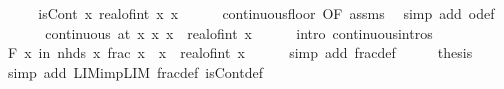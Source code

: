 \begin{isabellebody}
%
\isadelimproof
%
\endisadelimproof
%
\isatagproof
{}\isamarkupfalse%
\ {\isacharminus}{\kern0pt}\isanewline
\ \ \isamarkupfalse%
\ {\isachardoublequoteopen}isCont\ {\isacharparenleft}{\kern0pt}{\isasymlambda}x{\isachardot}{\kern0pt}\ real{\isacharunderscore}{\kern0pt}of{\isacharunderscore}{\kern0pt}int\ {\isasymlfloor}x{\isasymrfloor}{\isacharparenright}{\kern0pt}\ x{\isachardoublequoteclose}\isanewline
\ \ \ \ \isamarkupfalse%
\ continuous{\isacharunderscore}{\kern0pt}floor\ {\isacharbrackleft}{\kern0pt}OF\ assms{\isacharbrackright}{\kern0pt}\ \isamarkupfalse%
\ {\isacharparenleft}{\kern0pt}simp\ add{\isacharcolon}{\kern0pt}\ o{\isacharunderscore}{\kern0pt}def{\isacharparenright}{\kern0pt}\isanewline
\ \ \isamarkupfalse%
\ \isamarkupfalse%
\ {\isacharasterisk}{\kern0pt}{\isacharcolon}{\kern0pt}\ {\isachardoublequoteopen}continuous\ {\isacharparenleft}{\kern0pt}at\ x{\isacharparenright}{\kern0pt}\ {\isacharparenleft}{\kern0pt}{\isasymlambda}x{\isachardot}{\kern0pt}\ x\ {\isacharminus}{\kern0pt}\ real{\isacharunderscore}{\kern0pt}of{\isacharunderscore}{\kern0pt}int\ {\isasymlfloor}x{\isasymrfloor}{\isacharparenright}{\kern0pt}{\isachardoublequoteclose}\isanewline
\ \ \ \ \isamarkupfalse%
\ {\isacharparenleft}{\kern0pt}intro\ continuous{\isacharunderscore}{\kern0pt}intros{\isacharparenright}{\kern0pt}\isanewline
\ \ \isamarkupfalse%
\ \isamarkupfalse%
\ {\isachardoublequoteopen}{\isasymforall}\isactrlsub F\ x\ in\ nhds\ x{\isachardot}{\kern0pt}\ frac\ x\ {\isacharequal}{\kern0pt}\ x\ {\isacharminus}{\kern0pt}\ real{\isacharunderscore}{\kern0pt}of{\isacharunderscore}{\kern0pt}int\ {\isasymlfloor}x{\isasymrfloor}{\isachardoublequoteclose}\isanewline
\ \ \ \ \isamarkupfalse%
\ {\isacharparenleft}{\kern0pt}simp\ add{\isacharcolon}{\kern0pt}\ frac{\isacharunderscore}{\kern0pt}def{\isacharparenright}{\kern0pt}\isanewline
\ \ \isamarkupfalse%
\ \isamarkupfalse%
\ {\isacharquery}{\kern0pt}thesis\isanewline
\ \ \ \ \isamarkupfalse%
\ {\isacharparenleft}{\kern0pt}simp\ add{\isacharcolon}{\kern0pt}\ LIM{\isacharunderscore}{\kern0pt}imp{\isacharunderscore}{\kern0pt}LIM\ frac{\isacharunderscore}{\kern0pt}def\ isCont{\isacharunderscore}{\kern0pt}def{\isacharparenright}{\kern0pt}\isanewline
{}\isamarkupfalse%
%
\endisatagproof
{\isafoldproof}%
%
\isadelimproof
%
\endisadelimproof
%
\begin{isamarkuptext}%

\end{isamarkuptext}
\end{isabellebody}

